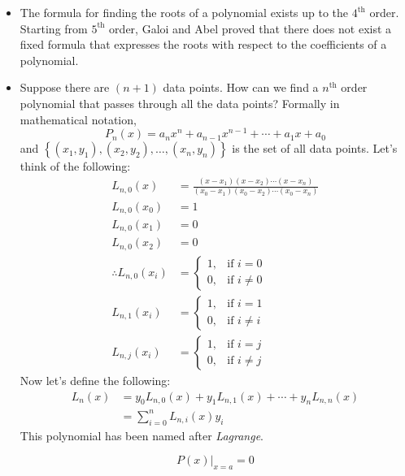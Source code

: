 \documentclass[11pt]{article}
\begin{document}
\begin{itemize}
  \item The formula for finding the roots of a polynomial exists up to the $4^{\text{th}}$ order. Starting from $5^{\text{th}}$ order, Galoi and Abel proved that there does not exist a fixed formula that expresses the roots with respect to the coefficients of a polynomial. 
  \item Suppose there are $(n+1)$ data points. How can we find a $n^{\text{th}}$ order polynomial that passes through all the data points? Formally in mathematical notation,
  $$
    P_{n}\left(x\right) = a_{n}x^{n} + a_{n-1}x^{n-1} + \cdots + a_{1}x + a_{0}
  $$
  and $\left\{\left(x_{1}, y_{1}\right), \left(x_{2}, y_{2}\right), \ldots , \left(x_{n}, y_{n}\right) \right\}$ is the set of all data points. Let's think of the following:
  \begin{align*}
    L_{n,0}\left(x\right) &= \frac{\left(x-x_{1}\right)\left(x-x_{2}\right)\cdots \left(x-x_{n}\right)}{\left(x_{0}-x_{1}\right)\left(x_{0}-x_{2}\right)\cdots \left(x_{0}-x_{n}\right)}\\
    L_{n,0}\left(x_{0}\right) &= 1\\
    L_{n,0}\left(x_{1}\right) &= 0\\
    L_{n,0}\left(x_{2}\right) &= 0\\
    \therefore L_{n,0}\left(x_{i}\right) &= \begin{cases} 1, & \text{if $i=0$}\\
    0, & \text{if $i\neq 0$} \end{cases}\\
    L_{n,1}\left(x_{i}\right) &= \begin{cases} 1, & \text{if $i=1$}\\
    0, & \text{if $i \neq i$} \end{cases}\\
    L_{n,j}\left(x_{i}\right) &= \begin{cases} 1, & \text{if $i=j$}\\
    0, & \text{if $i \neq j$} \end{cases}
  \end{align*}
  Now let's define the following:
  \begin{align*}
    L_{n}\left(x\right) &= y_{0}L_{n, 0}\left(x\right) + y_{1}L_{n,1}\left(x\right) + \cdots + y_{n}L_{n,n}\left(x\right)\\
    &= \sum_{i=0}^{n} L_{n,i}\left(x\right)y_{i}
  \end{align*}
This polynomial has been named after \emph{Lagrange}. 

$$
  P\left(x\right)|_{x=a}  = 0
$$
\end{itemize}
\end{document}
